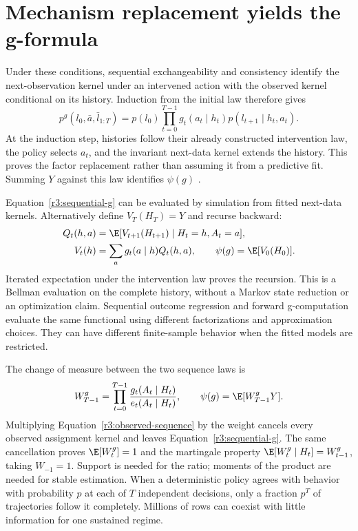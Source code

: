 \section{Mechanism replacement yields the g-formula}
\label{r3:g-formula}
Under these conditions, sequential exchangeability and consistency
identify the next-observation kernel under an intervened action with
the observed kernel conditional on its history. Induction from the
initial law therefore gives
\begin{equation}
 p^g(l_0,\bar a,\bar l_{1:T})
 =p(l_0)\prod_{t=0}^{T-1}g_t(a_t\mid h_t)
                              p(l_{t+1}\mid h_t,a_t).
 \label{r3:sequential-g}
\end{equation}
At the induction step, histories follow their already constructed
intervention law, the policy selects $a_t$, and the invariant next-data
kernel extends the history. This proves the factor replacement rather
than assuming it from a predictive fit. Summing $Y$ against this law
identifies $\psi(g)$ \citep[Chapter 21, Technical Point 21.1]{hernan2020}.

Equation~\eqref{r3:sequential-g} can be evaluated by simulation from
fitted next-data kernels. Alternatively define $V_T(H_T)=Y$ and recurse
backward:
\begin{align}
 Q_t(h,a)&=\E[V_{t+1}(H_{t+1})\mid H_t=h,A_t=a],\nonumber\\
 V_t(h)&=\sum_a g_t(a\mid h)Q_t(h,a),\qquad
 \psi(g)=\E[V_0(H_0)].
 \label{r3:sequential-recursion}
\end{align}
Iterated expectation under the intervention law proves the recursion.
This is a Bellman evaluation on the complete history, without a Markov
state reduction or an optimization claim. Sequential outcome regression
and forward g-computation evaluate the same functional using different
factorizations and approximation choices. They can have different
finite-sample behavior when the fitted models are restricted.

The change of measure between the two sequence laws is
\begin{equation}
 W_{T-1}^g=\prod_{t=0}^{T-1}
       \frac{g_t(A_t\mid H_t)}{e_t(A_t\mid H_t)},\qquad
 \psi(g)=\E[W_{T-1}^gY].
 \label{r3:sequence-weights}
\end{equation}
Multiplying Equation~\eqref{r3:observed-sequence} by the weight cancels
every observed assignment kernel and leaves
Equation~\eqref{r3:sequential-g}. The same cancellation proves
$\E[W_t^g]=1$ and the martingale property
$\E[W_t^g\mid H_t]=W_{t-1}^g$, taking $W_{-1}=1$.
Support is needed for the ratio; moments of the product are needed for
stable estimation. When a deterministic policy agrees with behavior
with probability $p$ at each of $T$ independent decisions, only a
fraction $p^T$ of trajectories follow it completely. Millions of rows
can coexist with little information for one sustained regime.

